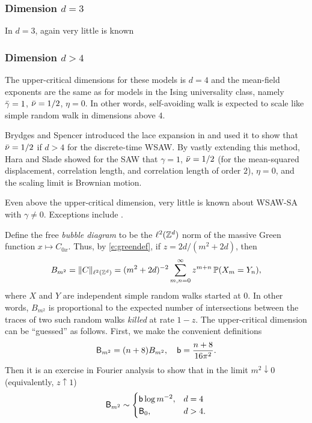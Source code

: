 \subsubsection{Dimension $d = 3$}

In $d = 3$, again very little is known 

\subsubsection{Dimension $d > 4$}

The upper-critical dimensions for these models is $d = 4$ and the mean-field
exponents are the same as for models in the Ising universality class, namely
$\bar\gamma=1$, $\bar\nu = 1/2$, $\eta = 0$. In other words, self-avoiding walk
is expected to scale like simple random walk in dimensions above $4$.

Brydges and Spencer introduced the lace expansion in \cite{BS85} and used it
to show that $\bar\nu = 1/2$ if $d > 4$ for the discrete-time WSAW.
By vastly extending this method, Hara and Slade \cite{HS92a,HS92b} showed for the
SAW that $\gamma = 1$, $\bar\nu = 1/2$ (for the mean-squared displacement, correlation
length, and correlation length of order $2$), $\eta = 0$, and the scaling limit
is Brownian motion.

Even above the upper-critical dimension, very little is known about WSAW-SA with
$\gamma \ne 0$. Exceptions include \cite{HH17,Uelt02}.

\begin{rk}
\label{rk:bubble}
Define the free \emph{bubble diagram} to be the $\ell^2({ {{\mathbb Z}}^d })$ norm of the massive
Green function $x \mapsto C_{0x}$. Thus, by
\eqref{e:greendef}, if $z = 2 d / (m^2 + 2 d)$, then
\begin{equation}
\label{e:bubble-def}
B_{m^2}
	=
\|C\|_{\ell^2({ {{\mathbb Z}}^d })}
	=
(m^2 + 2 d)^{-2} \sum_{m,n=0}^\infty z^{m+n} \operatorname{\mathbb{P}}(X_m = Y_n),
\end{equation}
where $X$ and $Y$ are independent simple random walks started at $0$. In other words,
$B_{m^2}$ is proportional to the expected number of intersections between the traces of two
such random walks \emph{killed} at rate $1 - z$. The upper-critical dimension can
be ``guessed'' as follows. First, we make the convenient definitions
\begin{equation}
\label{e:bubble}
{\sf B}_{m^2} = (n + 8) B_{m^2},
	\quad
{\sf b} = \frac{n + 8}{16\pi^2}.
\end{equation}
Then it is an exercise in Fourier analysis to show that in the limit $m^2\downarrow0$
(equivalently, $z\uparrow1$)
\begin{equation}
\label{e:bubble-log}
{\sf B}_{m^2}
	\sim
\begin{cases}
{\sf b} \log m^{-2},
	&
d = 4
	\\
{\sf B}_0,
	&
d > 4.
\end{cases}
\end{equation}
\end{rk}

